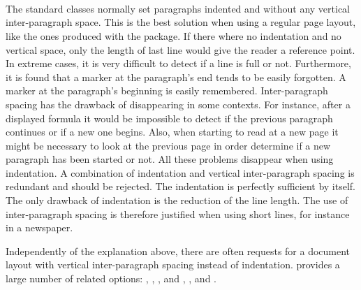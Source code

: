 \begin{Explain}%
\begin{Declaration}
  \\
  \\
  \\
  \\
  \\
  \\
  \\
  \\
\end{Declaration}%
%
%
%
%
%
%
%
%
%
  The standard classes normally set
  paragraphs indented and without any
  vertical inter-paragraph space.  This is the best solution when
  using a regular page layout, like the ones produced with the
   package. If there where no indentation and no
  vertical space, only the length of last line would give the reader a
  reference point. In extreme cases, it is very difficult to detect if
  a line is full or not. Furthermore, it is found that a marker at the
  paragraph's end tends to be easily forgotten. A marker at the
  paragraph's beginning is easily remembered.  Inter-paragraph spacing
  has the drawback of disappearing in some contexts. For instance,
  after a displayed formula it would be impossible to detect if the
  previous paragraph continues or if a new one begins. Also, when
  starting to read at a new page it might be necessary to look at the
  previous page in order determine if a new paragraph has been started
  or not. All these problems disappear when using indentation. A
  combination of indentation and vertical inter-paragraph spacing is
  redundant and should be rejected. The
  indentation is perfectly sufficient by
  itself. The only drawback of indentation is the reduction of the
  line length. The use of inter-paragraph spacing is therefore
  justified when using short lines, for instance in a newspaper.
\end{Explain}


Independently of the explanation above, there are often requests for a
document layout with vertical inter-paragraph spacing instead of
indentation.  \KOMAScript{} provides a large number of related
options: , , ,
 and , ,
 and .

